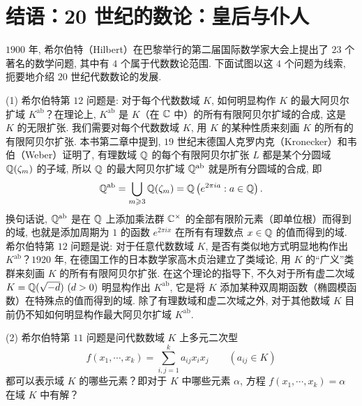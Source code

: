 \chapter*{结语：20 世纪的数论：皇后与仆人}

$1900$ 年, 希尔伯特（Hilbert）在巴黎举行的第二届国际数学家大会上提出了 $23$ 个著名的数学问题, 其中有 $4$ 个属于代数数论范围. 下面试图以这 $4$ 个问题为线索, 扼要地介绍 $20$ 世纪代数数论的发展.

(1) 希尔伯特第 $12$ 问题是: 对于每个代数数域 $K$, 如何明显构作 $K$ 的最大阿贝尔扩域 $K^{\mathrm{ab}}$？在理论上, $K^{\mathrm{ab}}$ 是 $K$（在 $\mathbb{C}$ 中）的所有有限阿贝尔扩域的合成, 这是 $K$ 的无限扩张. 我们需要对每个代数数域 $K$, 用 $K$ 的某种性质来刻画 $K$ 的所有的有限阿贝尔扩张. 本书第二章中提到, $19$ 世纪末德国人克罗内克（Kronecker）和韦伯（Weber）证明了, 有理数域 $\mathbb{Q}$ 的每个有限阿贝尔扩张 $L$ 都是某个分圆域 $\mathbb{Q}(\zeta_m)$ 的子域, 所以 $\mathbb{Q}$ 的最大阿贝尔扩域 $\mathbb{Q}^{\mathrm{ab}}$ 就是所有分圆域的合成, 即
\[
  \mathbb{Q}^{\mathrm{ab}}=\bigcup_{m\geqslant 3}\mathbb{Q}(\zeta_m)
  =\mathbb{Q}\left(e^{2\pi ia}:a\in\mathbb{Q}\right).
\]
换句话说, $\mathbb{Q}^{\mathrm{ab}}$ 是在 $\mathbb{Q}$ 上添加乘法群 $\mathbb{C}^{\times}$ 的全部有限阶元素（即单位根）而得到的域, 也就是添加周期为 $1$ 的函数 $e^{2\pi ix}$ 在所有有理数点 $x\in\mathbb{Q}$ 的值而得到的域. 希尔伯特第 $12$ 问题是说: 对于任意代数数域 $K$, 是否有类似地方式明显地构作出 $K^{\mathrm{ab}}$？$1920$ 年, 在德国工作的日本数学家高木贞治建立了类域论, 用 $K$ 的``广义''类群来刻画 $K$ 的所有有限阿贝尔扩张. 在这个理论的指导下, 不久对于所有虚二次域 $K=\mathbb{Q}(\sqrt{-d})\ (d>0)$ 明显构作出 $K^{\mathrm{ab}}$, 它是将 $K$ 添加某种双周期函数（椭圆模函数）在特殊点的值而得到的域. 除了有理数域和虚二次域之外, 对于其他数域 $K$ 目前仍不知如何明显构作最大阿贝尔扩域 $K^{\mathrm{ab}}$.

(2) 希尔伯特第 $11$ 问题是问代数数域 $K$ 上多元二次型
\[
  f(x_1,\cdots,x_k)=\sum_{i,j=1}^{k}a_{ij}x_ix_j\qquad(a_{ij}\in K)
\]
都可以表示域 $K$ 的哪些元素？即对于 $K$ 中哪些元素 $\alpha$, 方程 $f(x_1,\cdots,x_k)=\alpha$ 在域 $K$ 中有解？

